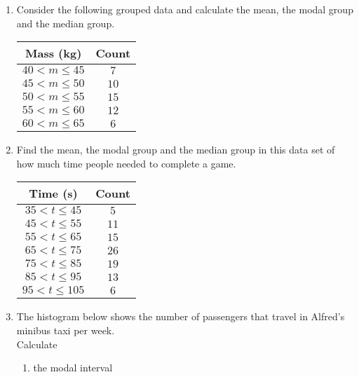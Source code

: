 \begin{exercises}{}{
  \begin{enumerate}[itemsep=8pt, label=\textbf{\arabic*}.]
 \item Consider the following grouped data and calculate the mean,
    the modal group and the median group.
\\
    \begin{center}
      \begin{tabular}{|c|c|}\hline
        \textbf{Mass (kg)} & \textbf{Count} \\\hline
        $40 < m \leq 45$ & $7$ \\\hline
        $45 < m \leq 50$ & $10$ \\\hline
        $50 < m \leq 55$ & $15$ \\\hline
        $55 < m \leq 60$ & $12$ \\\hline
        $60 < m \leq 65$ & $6$ \\\hline
      \end{tabular}
    \end{center}
\item Find the mean, the modal group and the median group in this
    data set of how much time people needed to complete a game.
\\
    \begin{center}
      \begin{tabular}{|c|c|} \hline
       \textbf{Time (s)} & \textbf{Count} \\ \hline
        $35 < t \leq 45$ & $5$ \\\hline
        $45 < t \leq 55$ & $11$ \\\hline
        $55 < t \leq 65$ & $15$ \\\hline
        $65 < t \leq 75$ & $26$ \\\hline
        $75 < t \leq 85$ & $19$ \\\hline
        $85 < t \leq 95$ & $13$ \\\hline
        $95 < t \leq 105$ & $6$ \\\hline
      \end{tabular}
    \end{center}
\item The histogram below shows the number of passengers that travel in Alfred's minibus taxi per week.\\
Calculate
\begin{enumerate}[noitemsep, label=\textbf{(\alph*)} ]
\item the modal interval

\end{enumerate}
\end{enumerate}}
\end{exercises}
